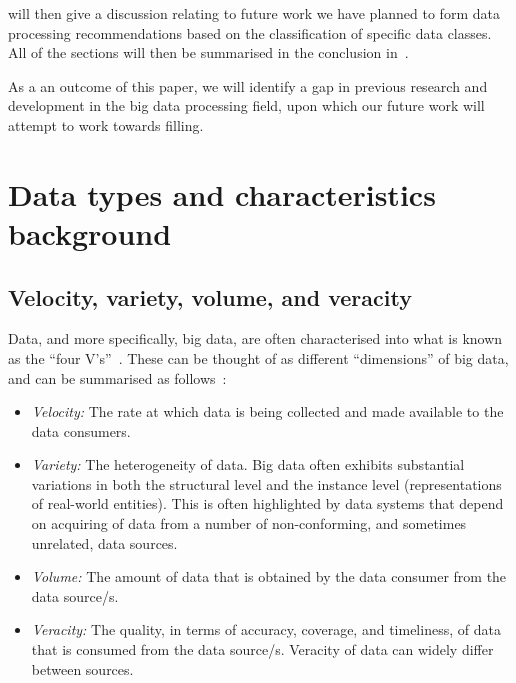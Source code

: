 \documentclass[a4paper,11pt]{article}
\begin{document}
 will then give a discussion relating to future work
we have planned to form data processing recommendations based on the classification of specific data classes. All of the
sections will then be summarised in the conclusion in~.

As a an outcome of this paper, we will identify a gap in previous research and development in the big data processing
field, upon which our future work will attempt to work towards filling.



\section{Data types and characteristics background} %
\label{sec:big_data_types_background}

\subsection{Velocity, variety, volume, and veracity} %
\label{sub:four_v}

Data, and more specifically, big data, are often characterised into what is known as the ``four V's''~\cite{wang2014bigdatabench}.
These can be thought of as different ``dimensions'' of big data, and can be summarised as follows~\cite{dong2013big}:

\begin{itemize}
  \item \emph{Velocity:} The rate at which data is being collected and made available to the data consumers.
  \item \emph{Variety:} The heterogeneity of data. Big data often exhibits substantial variations in both the structural
  level and the instance level (representations of real-world entities). This is often highlighted by data systems that
  depend on acquiring of data from a number of non-conforming, and sometimes unrelated, data sources.
  \item \emph{Volume:} The amount of data that is obtained by the data consumer from the data source/s.
  \item \emph{Veracity:} The quality, in terms of accuracy, coverage, and timeliness, of data that is consumed from
  the data source/s. Veracity of data can widely differ between sources.
\end{itemize}
\end{document}
